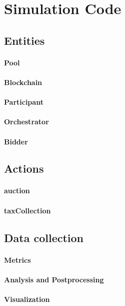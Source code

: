 \section{Simulation Code}
\label{appendix:code}


\subsection{Entities}

\paragraph{Pool}
\paragraph{Blockchain}
\paragraph{Participant}
\paragraph{Orchestrator}
\paragraph{Bidder}

\subsection{Actions}

\paragraph{auction}
\paragraph{taxCollection}

\subsection{Data collection}

\paragraph{Metrics}
\paragraph{Analysis and Postprocessing}
\paragraph{Visualization}